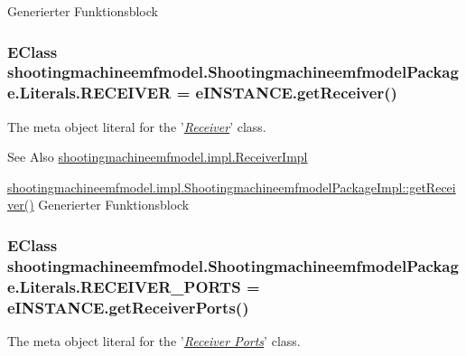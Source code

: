 Generierter Funktionsblock \hypertarget{interfaceshootingmachineemfmodel_1_1_shootingmachineemfmodel_package_1_1_literals_a50715f2844adcd5662cb7927a77a688a}{
\subsubsection[{R\-E\-C\-E\-I\-V\-E\-R}]{\setlength{\rightskip}{0pt plus 5cm}E\-Class shootingmachineemfmodel.\-Shootingmachineemfmodel\-Package.\-Literals.\-R\-E\-C\-E\-I\-V\-E\-R = e\-I\-N\-S\-T\-A\-N\-C\-E.\-get\-Receiver()}}\label{interfaceshootingmachineemfmodel_1_1_shootingmachineemfmodel_package_1_1_literals_a50715f2844adcd5662cb7927a77a688a}
The meta object literal for the '\hyperlink{classshootingmachineemfmodel_1_1impl_1_1_receiver_impl}{{\itshape Receiver}}' class.

\begin{DoxySeeAlso}{See Also}
\hyperlink{classshootingmachineemfmodel_1_1impl_1_1_receiver_impl}{shootingmachineemfmodel.\-impl.\-Receiver\-Impl} 

\hyperlink{classshootingmachineemfmodel_1_1impl_1_1_shootingmachineemfmodel_package_impl_a3a1f1115e25ffadf1e798560628d6535}{shootingmachineemfmodel.\-impl.\-Shootingmachineemfmodel\-Package\-Impl\-::get\-Receiver()} Generierter Funktionsblock 
\end{DoxySeeAlso}
\hypertarget{interfaceshootingmachineemfmodel_1_1_shootingmachineemfmodel_package_1_1_literals_a8a2c5b058053298e29f461c04c2f077e}{
\subsubsection[{R\-E\-C\-E\-I\-V\-E\-R\-\_\-\-P\-O\-R\-T\-S}]{\setlength{\rightskip}{0pt plus 5cm}E\-Class shootingmachineemfmodel.\-Shootingmachineemfmodel\-Package.\-Literals.\-R\-E\-C\-E\-I\-V\-E\-R\-\_\-\-P\-O\-R\-T\-S = e\-I\-N\-S\-T\-A\-N\-C\-E.\-get\-Receiver\-Ports()}}\label{interfaceshootingmachineemfmodel_1_1_shootingmachineemfmodel_package_1_1_literals_a8a2c5b058053298e29f461c04c2f077e}
The meta object literal for the '\hyperlink{classshootingmachineemfmodel_1_1impl_1_1_receiver_ports_impl}{{\itshape Receiver Ports}}' class.

